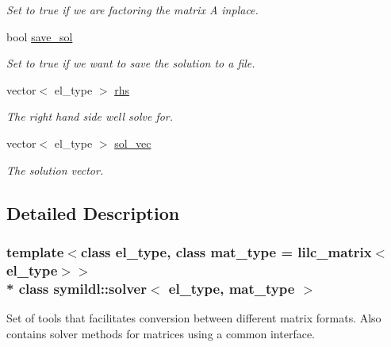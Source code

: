 \begin{DoxyCompactItemize}
\begin{DoxyCompactList}\small\item\em Set to true if we are factoring the matrix A inplace. \end{DoxyCompactList}\item 
bool \hyperlink{classsymildl_1_1solver_a15cbc9eafee18c6e5b4b3d5708cd99ab}{save\+\_\+sol}\hypertarget{classsymildl_1_1solver_a15cbc9eafee18c6e5b4b3d5708cd99ab}{}\label{classsymildl_1_1solver_a15cbc9eafee18c6e5b4b3d5708cd99ab}

\begin{DoxyCompactList}\small\item\em Set to true if we want to save the solution to a file. \end{DoxyCompactList}\item 
vector$<$ el\+\_\+type $>$ \hyperlink{classsymildl_1_1solver_af320afa2ff3bf787582d6f7f63163fba}{rhs}\hypertarget{classsymildl_1_1solver_af320afa2ff3bf787582d6f7f63163fba}{}\label{classsymildl_1_1solver_af320afa2ff3bf787582d6f7f63163fba}

\begin{DoxyCompactList}\small\item\em The right hand side we\textquotesingle{}ll solve for. \end{DoxyCompactList}\item 
vector$<$ el\+\_\+type $>$ \hyperlink{classsymildl_1_1solver_a46a736174489f53a638fb30a7697bb3b}{sol\+\_\+vec}\hypertarget{classsymildl_1_1solver_a46a736174489f53a638fb30a7697bb3b}{}\label{classsymildl_1_1solver_a46a736174489f53a638fb30a7697bb3b}

\begin{DoxyCompactList}\small\item\em The solution vector. \end{DoxyCompactList}\end{DoxyCompactItemize}


\subsection{Detailed Description}
\subsubsection*{template$<$class el\+\_\+type, class mat\+\_\+type = lilc\+\_\+matrix$<$el\+\_\+type$>$$>$\\*
class symildl\+::solver$<$ el\+\_\+type, mat\+\_\+type $>$}

Set of tools that facilitates conversion between different matrix formats. Also contains solver methods for matrices using a common interface. 

